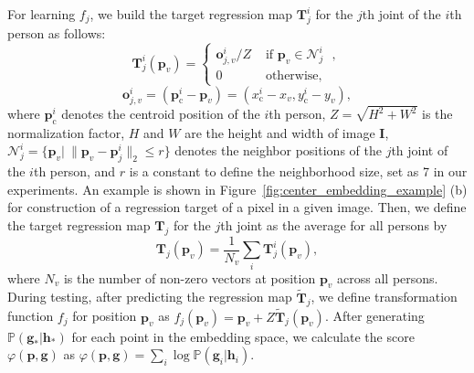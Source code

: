 \documentclass[10pt,twocolumn,letterpaper]{article}
\begin{document}
For learning $f_j$, we build  the target regression map $\mathbf{T}_{j}^i$  for the $j$th joint of the $i$th person as follows:
\begin{equation*}
\mathbf{T}_{j}^i(\mathbf{p}_v) = \left \{
\begin{array}{cl}
{\mathbf{o}_{j,v}^i}/{Z}   & \mbox{ if $\mathbf{p}_v \in \mathcal{N}_j^i$ }, \\
0                    & \mbox{ otherwise, }
\end{array} \right.
\end{equation*}
\begin{equation*}
\mathbf{o}_{j,v}^i=(\mathbf{p}_{\mathrm{c}}^i - \mathbf{p}_v)=(x_{\mathrm{c}}^i - x_v, y_{\mathrm{c}}^i - y_v),
\end{equation*}
where $\mathbf{p}_{\mathrm{c}}^i$ denotes the centroid position of the $i$th person, $Z{=}\sqrt{H^2+W^2}$ is the normalization factor, $H$ and $W$ are the height and width of image
$\mathbf{I}$, $\mathcal{N}_j^i{=}\{\mathbf{p}_v |~\|\mathbf{p}_v{-}\mathbf{p}_j^i\|_2{\leq}r \}$ denotes the neighbor positions of the $j$th joint of the $i$th person, and $r$ is
a constant to define the neighborhood size, set as 7 in our experiments. An example is shown in Figure~\ref{fig:center_embedding_example} (b) for construction of a regression target of a pixel in a given image.
Then, we define the target regression map $\mathbf{T}_{j}$ for the $j$th joint as the average for all persons by
\begin{equation*}
\mathbf{T}_{j}(\mathbf{p}_v) = \frac{1}{N_v}\sum_i \mathbf{T}_{j}^i(\mathbf{p}_v),
\end{equation*}
where $N_v$ is the number of non-zero vectors at position $\mathbf{p}_v$ across all persons. During testing, after predicting the  regression map $\tilde{\mathbf{T}}_{j}$,
we define transformation function $f_j$ for position $\mathbf{p}_v$ as $f_j(\mathbf{p}_v){=}\mathbf{p}_v + Z\tilde{\mathbf{T}}_{j}(\mathbf{p}_v)$.
After generating $\mathbb{P}(\mathbf{g}_{*}|\mathbf{h}_{*})$ for each point in the embedding space, we calculate the score $\varphi(\mathbf{p}, \mathbf{g})$ as $\varphi(\mathbf{p}, \mathbf{g}){=} \sum_{i}\log \mathbb{P}(\mathbf{g}_i|\mathbf{h}_i)$.
\end{document}
